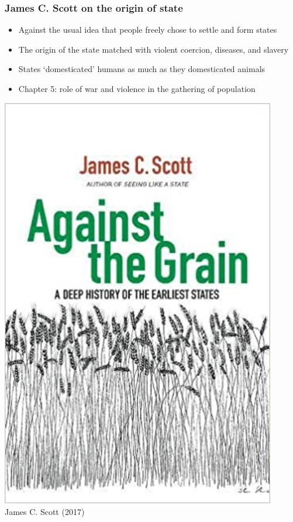 \documentclass[utf8, xcolor=dvipsnames, handout]{beamer}
\begin{document}
\begin{frame}
\frametitle{James C. Scott on the origin of state}
\centering

\begin{minipage}{0.6\textwidth}\centering
  \begin{itemize}
    \item Against the usual idea that people freely chose to settle and form states
    \item The origin of the state matched with violent coercion, diseases, and slavery
    \item States `domesticated' humans as much as they domesticated animals
    \item Chapter 5: role of war and violence in the gathering of population
  \end{itemize}
\end{minipage}\hfill
\begin{minipage}{0.39\textwidth}\centering
  \includegraphics[width = 0.9\textwidth]{img/scott_against}\\
  James C. Scott (2017)
\end{minipage}

\end{frame}
\end{document}
